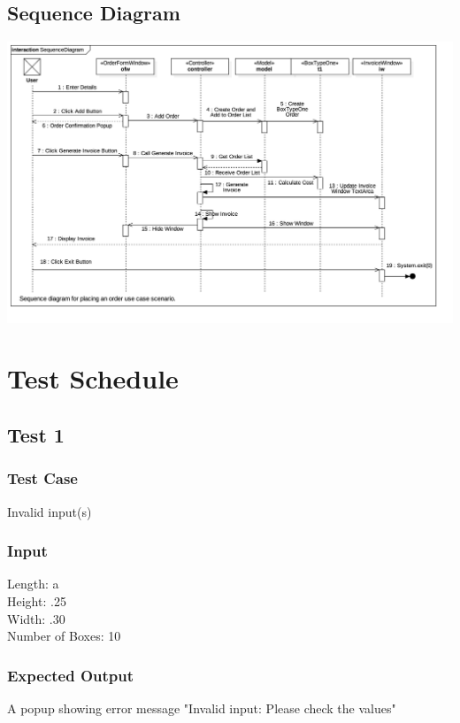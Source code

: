 \documentclass[12pt]{article}
\begin{document}
\subsection{Sequence Diagram}
\includegraphics[scale=.20]{./diagrams/SequenceDiagram.jpg}
\newpage
\section{Test Schedule}
\subsection{Test 1}
\subsubsection{Test Case}
Invalid input(s)
\subsubsection{Input}
Length: a\\
Height: .25\\
Width: .30\\
Number of Boxes: 10\\
\subsubsection{Expected Output}
A popup showing error message "Invalid input: Please check the values"
\end{document}

